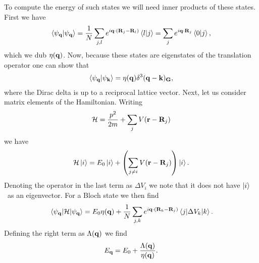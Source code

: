 To compute the energy of such states we will need inner products of these states. First we have
\begin{align*}
	\braket{\psi_{\vb{q}}} = \frac{1}{N}\sum\limits_{j, l}e^{i\vb{q}\cdot(\vb{R}_{j} - \vb{R}_{l})}\braket{l}{j} = \sum\limits_{j}e^{i\vb{q}\cdot\vb{R}_{j}}\braket{0}{j},
\end{align*}
which we dub $\eta(\vb{q})$. Now, because these states are eigenstates of the translation operator one can show that
\begin{align*}
	\braket{\psi_{\vb{q}}}{\psi_{\vb{k}}} = \eta(\vb{q})\delta^{3}(\vb{q} - \vb{k})_{\vb{G}},
\end{align*}
where the Dirac delta is up to a reciprocal lattice vector. Next, let us consider matrix elements of the Hamiltonian. Writing
\begin{align*}
	\mathcal{H} = \frac{p^{2}}{2m} + \sum\limits_{j}V(\vb{r} - \vb{R}_{j})
\end{align*}
we have
\begin{align*}
	\mathcal{H}\ket{i} = E_{0}\ket{i} + \left(\sum\limits_{j\neq i}V(\vb{r} - \vb{R}_{j})\right)\ket{i}.
\end{align*}
Denoting the operator in the last term as $\Delta V_{i}$ we note that it does not have $\ket{i}$ as an eigenvector. For a Bloch state we then find
\begin{align*}
	\mel{\psi_{\vb{q}}}{\ensuremath{\mathcal{H}}}{\psi_{\vb{q}}} = E_{0}\eta(\vb{q}) + \frac{1}{N}\sum\limits_{j, k}e^{i\vb{q}\cdot(\vb{R}_{k} - \vb{R}_{j})}\mel{j}{\Delta V_{k}}{k}.
\end{align*}
Defining the right term as $\Lambda(\vb{q})$ we find
\begin{align*}
	E_{\vb{q}} = E_{0} + \frac{\Lambda(\vb{q})}{\eta(\vb{q})}.
\end{align*}

